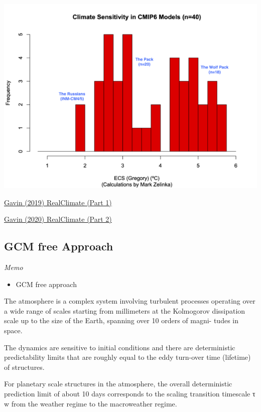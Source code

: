 \documentclass[
]{book}
\providecommand{\tightlist}{%
  \setlength{\itemsep}{0pt}\setlength{\parskip}{0pt}}
\begin{document}
\includegraphics{fig/Gavin_2020_cmip6_ecs.png}

\href{http://www.realclimate.org/index.php/archives/2019/11/sensitive-but-unclassified/}{Gavin (2019) RealClimate (Part 1)}

\href{http://www.realclimate.org/index.php/archives/2020/06/sensitive-but-unclassified-part-ii/}{Gavin (2020) RealClimate (Part 2)}

\hypertarget{gcm-free-approach}{%
\subsection{GCM free Approach}\label{gcm-free-approach}}

\emph{Memo}

\begin{itemize}
\tightlist
\item
  GCM free approach
\end{itemize}

The atmosphere is a complex system involving turbulent
processes operating over a wide range of scales starting
from millimeters at the Kolmogorov dissipation scale up
to the size of the Earth, spanning over 10 orders of magni-
tudes in space.

The dynamics are sensitive to initial conditions and there are
deterministic predictability limits that
are roughly equal to the eddy turn-over time (lifetime) of
structures.

For planetary scale structures in the atmosphere,
the overall deterministic prediction limit of about 10 days
corresponds to the scaling transition timescale τ w from the
weather regime to the macroweather regime.
\end{document}
